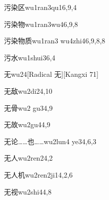 \begin{entry}{污染区}{wu1ran3qu1}{6,9,4}
\end{entry}

\begin{entry}{污染物}{wu1ran3wu4}{6,9,8}
\end{entry}

\begin{entry}{污染物质}{wu1ran3 wu4zhi4}{6,9,8,8}
\end{entry}

\begin{entry}{污水}{wu1shui3}{6,4}
\end{entry}

\begin{entry}{无}{wu2}{4}[Radical 无][Kangxi 71]
\end{entry}

\begin{entry}{无敌}{wu2di2}{4,10}
\end{entry}

\begin{entry}{无骨}{wu2 gu3}{4,9}
\end{entry}

\begin{entry}{无故}{wu2gu4}{4,9}
\end{entry}

\begin{entry}{无论……也……}{wu2lun4 ye3}{4,6,3}
\end{entry}

\begin{entry}{无人}{wu2ren2}{4,2}
\end{entry}

\begin{entry}{无人机}{wu2ren2ji1}{4,2,6}
\end{entry}

\begin{entry}{无视}{wu2shi4}{4,8}
\end{entry}

